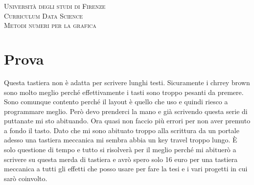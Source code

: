 \documentclass[12pt]{article}
\begin{document}
\begin{titlepage}
    \center 
    \textsc{\LARGE Università degli studi di Firenze}\\[1.5cm]

    \textsc{\LARGE Curriculum Data Science}\\[.5cm]

    \textsc{\large Metodi numeri per la grafica}\\[.5cm]

\end{titlepage}

\section{Prova}
Questa tastiera non è adatta per scrivere lunghi testi. 
Sicuramente i chrrey brown sono molto meglio perché effettivamente i tasti sono troppo pesanti da premere.
Sono comunque contento perché il layout è quello che uso e quindi riesco a programmare meglio. 
Però devo prenderci la mano e già scrivendo questa serie di puttanate mi sto abituando.
Ora quasi non faccio più errori per non aver premuto a fondo il tasto.
Dato che mi sono abituato troppo alla scrittura da un portale adesso una tastiera meccanica mi sembra abbia un
key travel troppo lungo.
È solo questione di tempo e tutto si risolverà per il meglio perché mi abituerò a scrivere su questa merda di tastiera e 
avrò spero solo 16 euro per una tastiera meccanica a tutti gli effetti che posso usare per fare la tesi e i vari progetti in cui sarò coinvolto.
\end{document}
